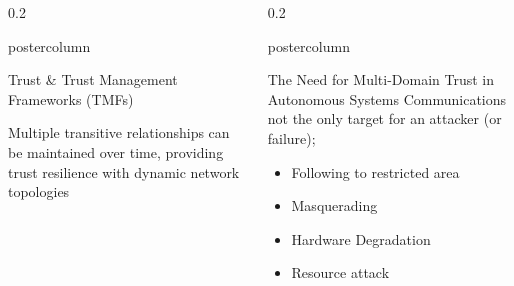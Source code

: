\documentclass[final,hyperref={pdfpagelabels=false}]{beamer}
\def\colwidth{0.2\linewidth}
\begin{document}
\begin{frame}[fragile]
\begin{columns}[T]
\begin{column}{\colwidth}
\begin{beamercolorbox}[center,wd=\textwidth]{postercolumn}
\begin{minipage}[T]{.99\textwidth}
{\begin{block}{Trust \& Trust Management Frameworks (TMFs)}
							\vspace{0.25\baselineskip}
														
							Multiple transitive relationships can be maintained over time, providing trust resilience with dynamic network topologies 
														
						\end{block}
					}
				\end{minipage}
			\end{beamercolorbox}
		\end{column}
				
		\begin{column}{\colwidth}
			\begin{beamercolorbox}[center,wd=\textwidth]{postercolumn}
				\begin{minipage}[T]{.98\textwidth} %
					\parbox[t]{\textwidth}{ %
						
						\begin{block}{The Need for Multi-Domain Trust in Autonomous Systems}
							Communications not the only target for an attacker (or failure);
							\begin{itemize}
								\item Following to restricted area
								\item Masquerading
								\item Hardware Degradation
								\item Resource attack
							\end{itemize}
							

\end{block}}
\end{minipage}
\end{beamercolorbox}
\end{column}
\end{columns}
\end{frame}
\end{document}
